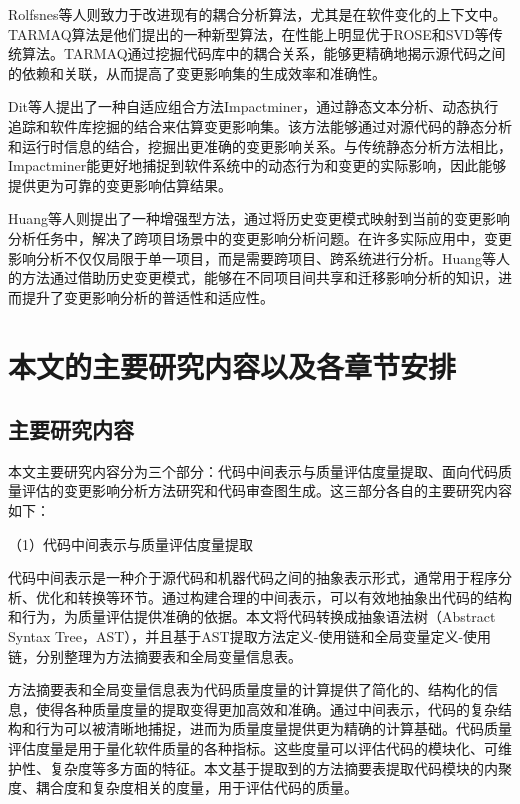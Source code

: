 Rolfsnes等人\cite{2016Generalizing}则致力于改进现有的耦合分析算法，尤其是在软件变化的上下文中。TARMAQ算法是他们提出的一种新型算法，在性能上明显优于ROSE\cite{ROSE2005Mining}和SVD等传统算法。TARMAQ通过挖掘代码库中的耦合关系，能够更精确地揭示源代码之间的依赖和关联，从而提高了变更影响集的生成效率和准确性。

Dit等人\cite{2014ImpactMiner}提出了一种自适应组合方法Impactminer，通过静态文本分析、动态执行追踪和软件库挖掘的结合来估算变更影响集。该方法能够通过对源代码的静态分析和运行时信息的结合，挖掘出更准确的变更影响关系。与传统静态分析方法相比，Impactminer能更好地捕捉到软件系统中的动态行为和变更的实际影响，因此能够提供更为可靠的变更影响估算结果。

Huang等人\cite{2021Change}则提出了一种增强型方法，通过将历史变更模式映射到当前的变更影响分析任务中，解决了跨项目场景中的变更影响分析问题。在许多实际应用中，变更影响分析不仅仅局限于单一项目，而是需要跨项目、跨系统进行分析。Huang等人的方法通过借助历史变更模式，能够在不同项目间共享和迁移影响分析的知识，进而提升了变更影响分析的普适性和适应性。






\section{本文的主要研究内容以及各章节安排}
\subsection{主要研究内容}
本文主要研究内容分为三个部分：代码中间表示与质量评估度量提取、面向代码质量评估的变更影响分析方法研究和代码审查图生成。这三部分各自的主要研究内容如下：

（1）代码中间表示与质量评估度量提取

代码中间表示是一种介于源代码和机器代码之间的抽象表示形式，通常用于程序分析、优化和转换等环节。通过构建合理的中间表示，可以有效地抽象出代码的结构和行为，为质量评估提供准确的依据。本文将代码转换成抽象语法树（Abstract Syntax Tree，AST），并且基于AST提取方法定义-使用链和全局变量定义-使用链，分别整理为方法摘要表和全局变量信息表。

方法摘要表和全局变量信息表为代码质量度量的计算提供了简化的、结构化的信息，使得各种质量度量的提取变得更加高效和准确。通过中间表示，代码的复杂结构和行为可以被清晰地捕捉，进而为质量度量提供更为精确的计算基础。代码质量评估度量是用于量化软件质量的各种指标。这些度量可以评估代码的模块化、可维护性、复杂度等多方面的特征。本文基于提取到的方法摘要表提取代码模块的内聚度、耦合度和复杂度相关的度量，用于评估代码的质量。

